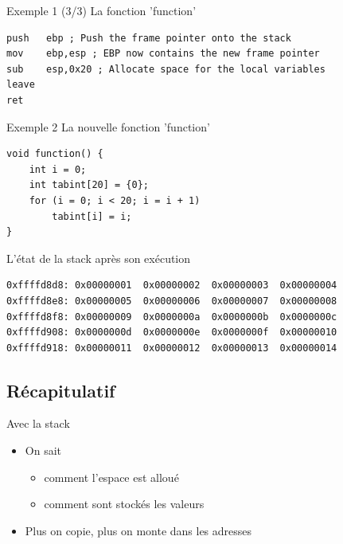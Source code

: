 \documentclass{beamer}
\begin{document}
\begin{frame}[fragile]{Exemple 1 (3/3)}
	La fonction 'function'
	\begin{verbatim}
push   ebp ; Push the frame pointer onto the stack
mov    ebp,esp ; EBP now contains the new frame pointer
sub    esp,0x20 ; Allocate space for the local variables
leave  
ret
	\end{verbatim}
\end{frame}

\begin{frame}[fragile]{Exemple 2}
	La nouvelle fonction 'function'
	\begin{verbatim}
void function() {
    int i = 0;
    int tabint[20] = {0};
    for (i = 0; i < 20; i = i + 1)
        tabint[i] = i;
}
	\end{verbatim}
	L'état de la stack après son exécution
	\begin{verbatim}
0xffffd8d8:	0x00000001	0x00000002	0x00000003	0x00000004
0xffffd8e8:	0x00000005	0x00000006	0x00000007	0x00000008
0xffffd8f8:	0x00000009	0x0000000a	0x0000000b	0x0000000c
0xffffd908:	0x0000000d	0x0000000e	0x0000000f	0x00000010
0xffffd918:	0x00000011	0x00000012	0x00000013	0x00000014
	\end{verbatim}
\end{frame}

\subsection{Récapitulatif}

\begin{frame}{Avec la stack}
	\begin{itemize}
		\itemsep1.3em
		\item On sait
		\begin{itemize}
			\itemsep1.3em
			\item comment l'espace est alloué
			\item comment sont stockés les valeurs
		\end{itemize}
		\item Plus on copie, plus on monte dans les adresses
	\end{itemize}
\end{frame}
\end{document}
